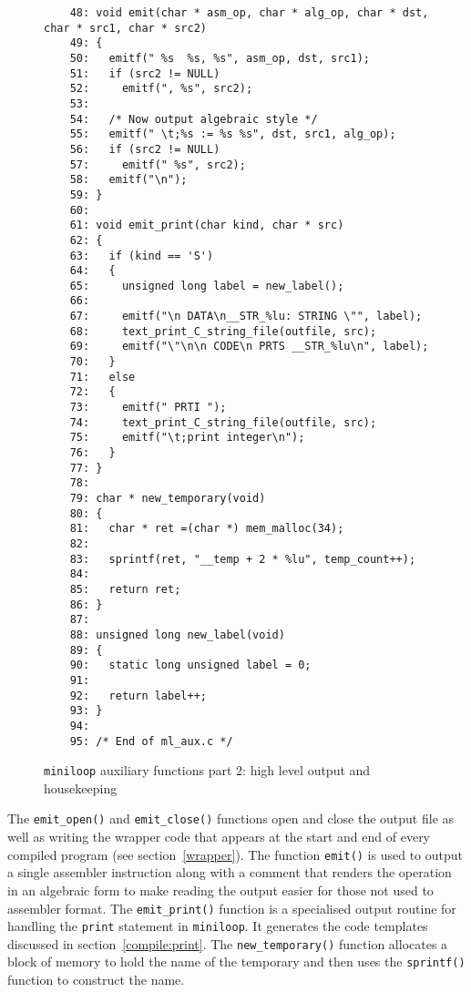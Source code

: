 \begin{figure}
\hspace*{-1cm}
\footnotesize
\begin{minipage}{30cm}
\begin{verbatim}
    48: void emit(char * asm_op, char * alg_op, char * dst, char * src1, char * src2)
    49: {
    50:   emitf(" %s  %s, %s", asm_op, dst, src1); 
    51:   if (src2 != NULL)
    52:     emitf(", %s", src2); 
    53:   
    54:   /* Now output algebraic style */
    55:   emitf(" \t;%s := %s %s", dst, src1, alg_op); 
    56:   if (src2 != NULL)
    57:     emitf(" %s", src2); 
    58:   emitf("\n"); 
    59: }
    60: 
    61: void emit_print(char kind, char * src)
    62: {
    63:   if (kind == 'S')
    64:   {
    65:     unsigned long label = new_label(); 
    66:     
    67:     emitf("\n DATA\n__STR_%lu: STRING \"", label); 
    68:     text_print_C_string_file(outfile, src); 
    69:     emitf("\"\n\n CODE\n PRTS __STR_%lu\n", label); 
    70:   }
    71:   else
    72:   {
    73:     emitf(" PRTI "); 
    74:     text_print_C_string_file(outfile, src); 
    75:     emitf("\t;print integer\n"); 
    76:   }
    77: }
    78: 
    79: char * new_temporary(void)
    80: {
    81:   char * ret =(char *) mem_malloc(34); 
    82:   
    83:   sprintf(ret, "__temp + 2 * %lu", temp_count++); 
    84:   
    85:   return ret; 
    86: }
    87: 
    88: unsigned long new_label(void)
    89: {
    90:   static long unsigned label = 0; 
    91:   
    92:   return label++; 
    93: }
    94: 
    95: /* End of ml_aux.c */
\end{verbatim}
\end{minipage}
\caption{{\tt miniloop} auxiliary functions part 2: high level output and housekeeping}
\label{ml_aux.c:2}
\end{figure}
The \verb|emit_open()| and \verb|emit_close()| functions open and close the
output file as well as writing the wrapper code that appears at the start and
end of every compiled program (see section~\ref{wrapper}). The function \verb|emit()|
is used to output a single assembler instruction along with a comment that renders
the operation in an algebraic form to make reading the output easier for those not used
to assembler format. The \verb|emit_print()|
function is a specialised output routine for handling the {\tt print} statement in
{\tt miniloop}. It generates the code templates discussed in section~\ref{compile:print}.
The \verb|new_temporary()| function allocates a block of memory to hold the name of the
temporary and then uses the {\tt sprintf()} function to construct the name.

